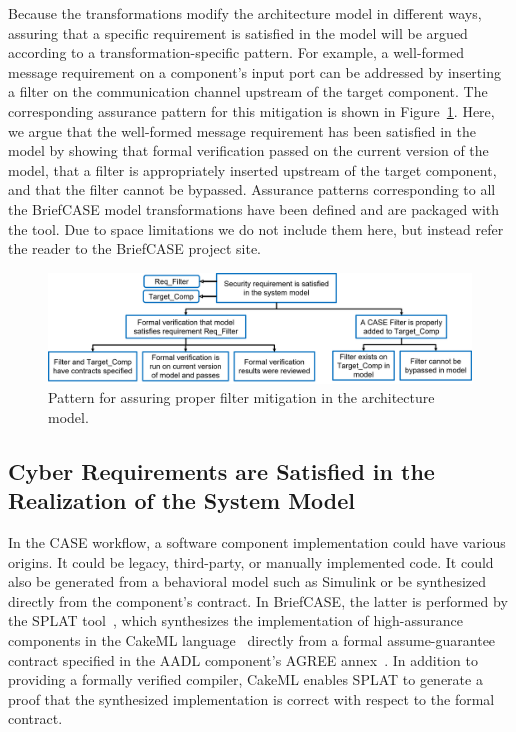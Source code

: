 Because the transformations modify the architecture model in different ways, assuring that a specific requirement is satisfied in the model will be argued according to a transformation-specific pattern.  For example, a well-formed message requirement on a component's input port can be addressed by inserting a filter on the communication channel upstream of the target component.  The corresponding assurance pattern for this mitigation is shown in Figure~\ref{fig:filter}.  Here, we argue that the well-formed message requirement has been satisfied in the model by showing that formal verification passed on the current version of the model, that a filter is appropriately inserted upstream of the target component, and that the filter cannot be bypassed.  Assurance patterns corresponding to all the BriefCASE model transformations have been defined and are packaged with the tool.  Due to space limitations we do not include them here, but instead refer the reader to the BriefCASE project site.

\begin{figure}[h] 
	\centering 
	\includegraphics[width=\textwidth]{figs/filter.png}
	\caption{Pattern for assuring proper filter mitigation in the architecture model.}
	\label{fig:filter} 
\end{figure}

\subsection{Cyber Requirements are Satisfied in the Realization of the System Model}

In the CASE workflow, a software component implementation could have various origins.  It could be legacy, third-party, or manually implemented code. It could also be generated from a behavioral model such as Simulink or be synthesized directly from the component's contract.  In BriefCASE, the latter is performed by the SPLAT tool~\cite{case-verified-filter}, which synthesizes the implementation of high-assurance components in the CakeML language~\cite{cakeml} directly from a formal assume-guarantee contract specified in the AADL component's AGREE annex~\cite{compositional-analysis-agree}.  In addition to providing a formally verified compiler, CakeML enables SPLAT to generate a proof that the synthesized implementation is correct with respect to the formal contract.

